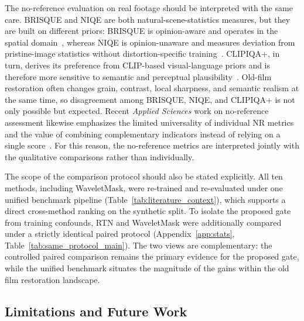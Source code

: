 The no-reference evaluation on real footage should be interpreted with the same care. BRISQUE and NIQE are both natural-scene-statistics measures, but they are built on different priors: BRISQUE is opinion-aware and operates in the spatial domain~\cite{mittal2012brisque}, whereas NIQE is opinion-unaware and measures deviation from pristine-image statistics without distortion-specific training~\cite{mittal2013niqe}. CLIPIQA+, in turn, derives its preference from CLIP-based visual-language priors and is therefore more sensitive to semantic and perceptual plausibility~\cite{wang2023clipiqa}. Old-film restoration often changes grain, contrast, local sharpness, and semantic realism at the same time, so disagreement among BRISQUE, NIQE, and CLIPIQA+ is not only possible but expected. Recent \textit{Applied Sciences} work on no-reference assessment likewise emphasizes the limited universality of individual NR metrics and the value of combining complementary indicators instead of relying on a single score~\cite{rubel2022combinednr}. For this reason, the no-reference metrics are interpreted jointly with the qualitative comparisons rather than individually.

The scope of the comparison protocol should also be stated explicitly. All ten methods, including WaveletMask, were re-trained and re-evaluated under one unified benchmark pipeline (Table~\ref{tab:literature_context}), which supports a direct cross-method ranking on the synthetic split. To isolate the proposed gate from training confounds, RTN and WaveletMask were additionally compared under a strictly identical paired protocol (Appendix~\ref{app:stats}, Table~\ref{tab:same_protocol_main}). The two views are complementary: the controlled paired comparison remains the primary evidence for the proposed gate, while the unified benchmark situates the magnitude of the gains within the old film restoration landscape.

\subsection{Limitations and Future Work}\label{subsec:limitations}

